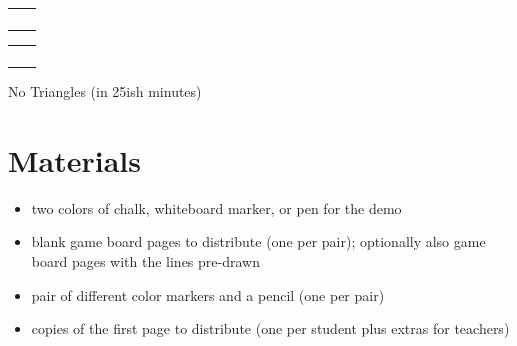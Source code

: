 \documentclass{article}
\begin{document}
    \clearpage
    \begin{center}
        \begin{tabular}{c | c}
             &  \\[1cm]
            \hline\\[1cm]
             &  \\[1cm]
            \hline\\[1cm]
             &  \\[1cm]
        \end{tabular}
    \end{center}
    \clearpage
    \begin{center}
        \begin{tabular}{c | c}
             &  \\[1cm]
            \hline\\[1cm]
             &  \\[1cm]
            \hline\\[1cm]
             &  \\[1cm]
        \end{tabular}
    \end{center}
    \clearpage
    \begin{Huge}
        No Triangles (in 25ish minutes)
    \end{Huge}

    \hrulefill 

    \section{Materials}
        \begin{itemize}
            \item two colors of chalk, whiteboard marker, or pen for the demo
            \item blank game board pages to distribute (one per pair); optionally also game board pages with the lines pre-drawn
            \item pair of different color markers and a pencil (one per pair)
            \item copies of the first page to distribute (one per student plus extras for teachers)
        \end{itemize}
\end{document}
